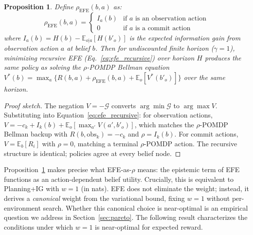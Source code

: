 \documentclass{article}
\newtheorem{proposition}{Proposition}[section]
\begin{document}
\begin{proposition}
\label{prop:equivalence}
Define $\rho_{\mathrm{EFE}}(b, a)$ as:
\begin{equation*}
    \rho_{\mathrm{EFE}}(b, a) = \begin{cases} I_a(b) & \text{if } a \text{ is an observation action} \\ 0 & \text{if } a \text{ is a commit action} \end{cases}
\end{equation*}
where $I_a(b) = H(b) - \mathbb{E}_{o|a}[H(b'_o)]$ is the expected information gain from observation action $a$ at belief $b$. Then for undiscounted finite horizon ($\gamma{=}1$), minimizing recursive EFE (Eq.~\ref{eq:efe_recursive}) over horizon $H$ produces the same policy as solving the $\rho$-POMDP Bellman equation $V^*(b) = \max_a \{R(b,a) + \rho_{\mathrm{EFE}}(b,a) + \mathbb{E}_o[V^*(b'_o)]\}$ over the same horizon.
\end{proposition}
\begin{proof}[Proof sketch]
The negation $V = -\mathcal{G}$ converts $\arg\min \mathcal{G}$ to $\arg\max V$. Substituting into Equation~\ref{eq:efe_recursive}: for observation actions, $V = -c_k + I_k(b) + \mathbb{E}_o[\max_{a'} V(a', b'_o)]$, which matches the $\rho$-POMDP Bellman backup with $R(b, \text{obs}_k) = -c_k$ and $\rho = I_k(b)$. For commit actions, $V = \mathbb{E}_b[R_i]$ with $\rho = 0$, matching a terminal $\rho$-POMDP action. The recursive structure is identical; policies agree at every belief node.
\end{proof}

Proposition~\ref{prop:equivalence} makes precise what EFE-as-$\rho$ means: the epistemic term of EFE functions as an action-dependent belief utility. Crucially, this is equivalent to Planning+IG with $w{=}1$ (in nats). EFE does not eliminate the weight; instead, it derives a \emph{canonical} weight from the variational bound, fixing $w{=}1$ without per-environment search. Whether this canonical choice is near-optimal is an empirical question we address in Section~\ref{sec:pareto}. The following result characterizes the conditions under which $w{=}1$ is near-optimal for expected reward.
\end{document}
